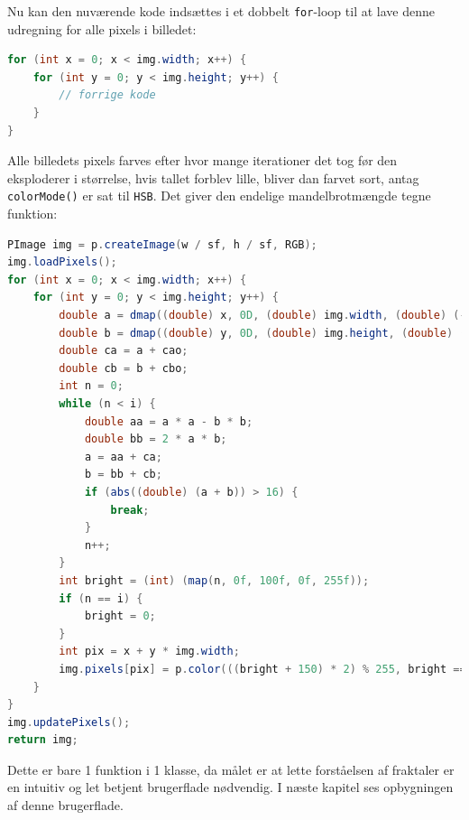 \documentclass{article}
\begin{document}
Nu kan den nuværende kode indsættes i et dobbelt \texttt{for}-loop til at lave denne udregning for alle pixels i billedet:
\begin{lstlisting}[language=Java]
for (int x = 0; x < img.width; x++) {
    for (int y = 0; y < img.height; y++) {
        // forrige kode
    }
}
\end{lstlisting}
Alle billedets pixels farves efter hvor mange iterationer det tog før den eksploderer i størrelse, hvis tallet forblev lille, bliver dan farvet sort, antag \texttt{colorMode()} er sat til \texttt{HSB}. Det giver den endelige mandelbrotmængde tegne funktion:
\begin{lstlisting}[language=Java]
PImage img = p.createImage(w / sf, h / sf, RGB);
img.loadPixels();
for (int x = 0; x < img.width; x++) {
    for (int y = 0; y < img.height; y++) {
        double a = dmap((double) x, 0D, (double) img.width, (double) (-2.5 / z + ox), (double) (2.5 / z + ox));
        double b = dmap((double) y, 0D, (double) img.height, (double) (-2.5 / z + oy), (double) (2.5 / z + oy));
        double ca = a + cao;
        double cb = b + cbo;
        int n = 0;
        while (n < i) {
            double aa = a * a - b * b;
            double bb = 2 * a * b;
            a = aa + ca;
            b = bb + cb;
            if (abs((double) (a + b)) > 16) {
                break;
            }
            n++;
        }
        int bright = (int) (map(n, 0f, 100f, 0f, 255f));
        if (n == i) {
            bright = 0;
        }
        int pix = x + y * img.width;
        img.pixels[pix] = p.color(((bright + 150) * 2) % 255, bright == 0 ? 0 : 255, bright == 0 ? 0 : 255);
    }
}
img.updatePixels();
return img;
\end{lstlisting}
Dette er bare 1 funktion i 1 klasse, da målet er at lette forståelsen af fraktaler er en intuitiv og let betjent brugerflade nødvendig. I næste kapitel ses opbygningen af denne brugerflade.
\end{document}
